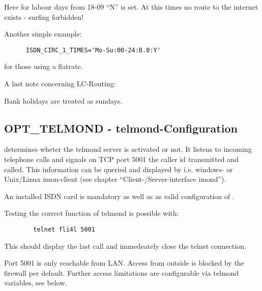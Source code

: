 \begin{description}
\begin{description}
      Here for labour days from 18-09 ``N'' is set. At this times no route to 
      the internet exists - surfing forbidden!

      
    \item Another simple example:

\begin{example}
\begin{verbatim}
      ISDN_CIRC_1_TIMES='Mo-Su:00-24:0.0:Y'        
\end{verbatim}
\end{example}
      
      for those using a flatrate.


      
    \item A last note concerning LC-Routing:
      
      Bank holidays are treated as sundays.
    \end{description}

\end{description}

\subsection {OPT\_TELMOND - telmond-Configuration}

 determines wheter the telmond server is activated 
or not. It listens to incoming telephone calls and signals on TCP port 
5001 the caller id transmitted and called. This information can be queried 
and displayed by i.e. windows- or Unix/Linux imon-client (see chapter 
``Client-/Server-interface imond'').

An installed ISDN card is mandatory as well as as valid configuration 
of .

Testing the correct function of telmond is possible with:

\begin{example}
\begin{verbatim}
        telnet fli4l 5001        
\end{verbatim}
\end{example}

This should display the last call and immedeately close the telnet 
connection.

Port 5001 is only reachable from LAN. Access from outside is blocked 
by the firewall per default. Further access limitations are configurable 
via telmond variables, see below.

